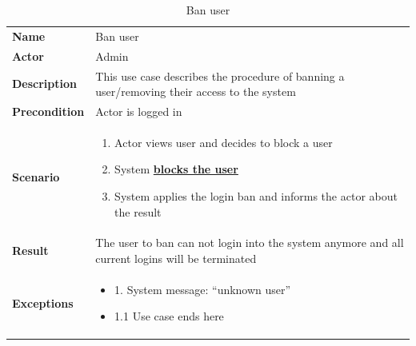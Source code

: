 \begin{table}[ht]
    \caption{Ban user}
    \begin{tabular}{|L{5cm}|L{10cm}|}
        \toprule
        \textbf{Name}         & Ban user                                                                                        \\
        \textbf{Actor}        & Admin                                                                                           \\
        \textbf{Description}  & This use case describes the procedure of banning a user/removing their access to the system     \\
        \textbf{Precondition} & Actor is logged in                                                                              \\
        \textbf{Scenario} &
        \vspace{-0.75cm}
        \begin{enumerate}
            \setlength\itemsep{-0.5em}
            \item Actor views user and decides to block a user
            \item System \hyperref[tab:table28]{\textbf{blocks the user}}
            \item System applies the login ban and informs the actor about the result
        \end{enumerate} \\[-0.5cm]
        \textbf{Result}       & The user to ban can not login into the system anymore and all current logins will be terminated \\
        \textbf{Exceptions} &
        \vspace{-0.75cm}
        \begin{itemize}
            \setlength\itemsep{-0.5em}
            \item 1. System message: \enquote{unknown user}
            \item 1.1 Use case ends here
        \end{itemize} \\
        \bottomrule
    \end{tabular}
    \label{tab:table27}
\end{table}

